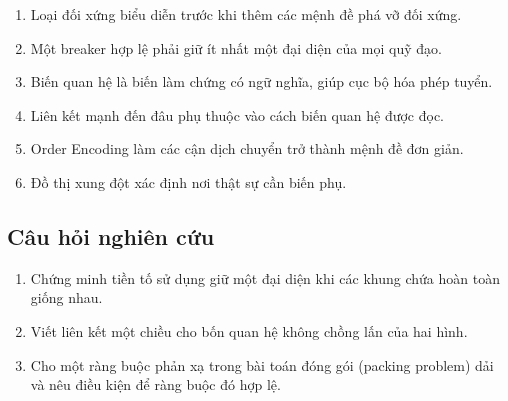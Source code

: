 \begin{summarybox}
\begin{enumerate}
  \item Loại đối xứng biểu diễn trước khi thêm các mệnh đề phá vỡ đối xứng.
  \item Một breaker hợp lệ phải giữ ít nhất một đại diện của mọi quỹ đạo.
  \item Biến quan hệ là biến làm chứng có ngữ nghĩa, giúp cục bộ hóa phép tuyển.
  \item Liên kết mạnh đến đâu phụ thuộc vào cách biến quan hệ được đọc.
  \item Order Encoding làm các cận dịch chuyển trở thành mệnh đề đơn giản.
  \item Đồ thị xung đột xác định nơi thật sự cần biến phụ.
\end{enumerate}
\end{summarybox}

\subsection*{Câu hỏi nghiên cứu}
\begin{enumerate}
  \item Chứng minh tiền tố sử dụng giữ một đại diện khi các khung chứa hoàn
  toàn giống nhau.
  \item Viết liên kết một chiều cho bốn quan hệ không chồng lấn của hai hình.
  \item Cho một ràng buộc phản xạ trong bài toán đóng gói (packing problem) dải và nêu điều kiện
  để ràng buộc đó hợp lệ.
\end{enumerate}
